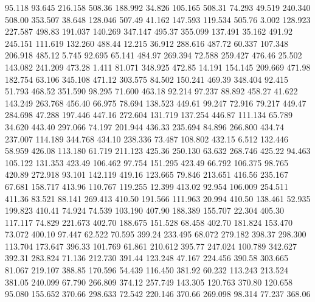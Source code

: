   95.118   93.645  216.158       508.36
 188.992   34.826  105.165       508.31
  74.293   49.519  240.340       508.00
 353.507   38.648  128.046       507.49
  41.162  147.593  119.534       505.76
   3.002  128.923  227.587       498.83
 191.037  140.269  347.147       495.37
 355.099  137.491   35.162       491.92
 245.151  111.619  132.260       488.44
  12.215   36.912  288.616       487.72
  60.337  107.348  206.918       485.12
   5.745   92.695   65.141       484.97
 269.394   72.588  259.427       476.46
  25.502  143.082  241.209       473.28
   1.411   81.071  348.925       472.85
  14.191  154.145  209.669       471.98
 182.754   63.106  345.108       471.12
 303.575   84.502  150.241       469.39
 348.404   92.415   51.793       468.52
 351.590   98.295   71.600       463.18
  92.214   97.237   88.892       458.27
  41.622  143.249  263.768       456.40
  66.975   78.694  138.523       449.61
  99.247   72.916   79.217       449.47
 284.698   47.288  197.446       447.16
 272.604  131.719  137.254       446.87
 111.134   65.789   34.620       443.40
 297.066   74.197  201.944       436.33
 235.694   84.896  266.800       434.74
 237.007  114.189  344.768       434.10
 238.336   73.487  108.802       432.15
   6.512  132.446   58.959       426.08
 113.180   61.719  211.123       425.36
 250.130   63.632  268.746       425.22
  94.463  105.122  131.353       423.49
 106.462   97.754  151.295       423.49
  66.792  106.375   98.765       420.89
 272.918   93.101  142.119       419.16
 123.665   79.846  213.651       416.56
 235.167   67.681  158.717       413.96
 110.767  119.255   12.399       413.02
  92.954  106.009  254.511       411.36
  83.521   88.141  269.413       410.50
 191.566  111.963   20.994       410.50
 138.461   52.935  199.823       410.41
  74.924   74.539  103.190       407.90
 188.389  155.707   22.304       405.30
 117.117   74.829  221.673       402.70
 188.675  151.528   68.458       402.70
 181.824  153.470   73.072       400.10
  97.447   62.522   70.595       399.24
 233.495   68.072  279.182       398.37
 298.300  113.704  173.647       396.33
 101.769   61.861  210.612       395.77
 247.024  100.789  342.627       392.31
 283.824   71.136  212.730       391.44
 123.248   47.167  224.456       390.58
 303.665   81.067  219.107       388.85
 170.596   54.439  116.450       381.92
  60.232  113.243  213.524       381.05
 240.099   67.790  266.809       374.12
 257.749  143.305  120.763       370.80
 120.658   95.080  155.652       370.66
 298.633   72.542  220.146       370.66
 269.098   98.314   77.237       368.06
